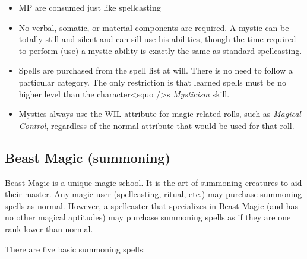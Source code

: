 \begin{itemize}
\item MP are consumed just like spellcasting
\item No verbal, somatic, or material components are required.  A
  mystic can be totally still and silent and can sill use his
  abilities, though the time required to perform (use) a mystic
  ability is exactly the same as standard spellcasting.
\item Spells are purchased from the spell list at will.  There is no
  need to follow a particular category.  The only restriction is that
  learned spells must be no higher level than the character<squo />s
  \emph{Mysticism} skill.
\item Mystics always use the WIL attribute for magic-related rolls,
  such as \emph{Magical Control}, regardless of the normal attribute
  that would be used for that roll.
\end{itemize}

\subsection{Beast Magic (summoning)}

Beast Magic is a unique magic school.  It is the art of summoning
creatures to aid their master.  Any magic user (spellcasting, ritual,
etc.) may purchase summoning spells as normal.  However, a spellcaster
that specializes in Beast Magic (and has no other magical aptitudes)
may purchase summoning spells as if they are one rank lower than
normal.

There are five basic summoning spells:


